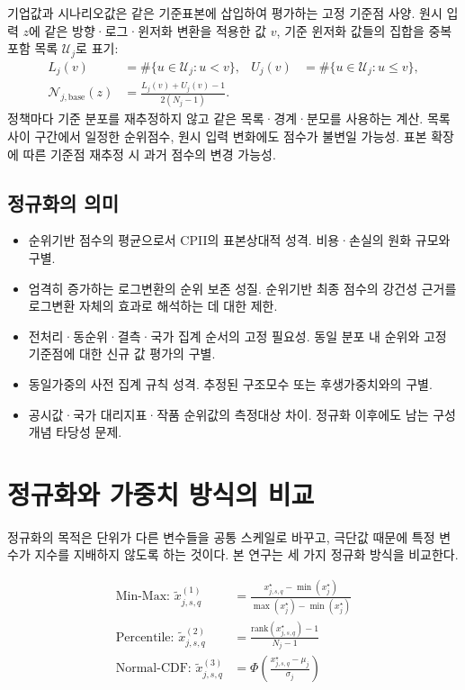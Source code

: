 \documentclass[11pt,a4paper]{report}
\begin{document}
기업값과 시나리오값은 같은 기준표본에 삽입하여 평가하는 고정 기준점 사양. 원시 입력 \(z\)에 같은 방향·로그·윈저화 변환을 적용한 값 \(v\), 기준 윈저화 값들의 집합을 중복 포함 목록 \(\mathcal U_j\)로 표기:
\[
\begin{aligned}
L_j(v)&=\#\{u\in\mathcal U_j:u<v\},&
U_j(v)&=\#\{u\in\mathcal U_j:u\le v\},\\
\mathcal N_{j,\mathrm{base}}(z)
&=\frac{L_j(v)+U_j(v)-1}{2(N_j-1)}.
\end{aligned}
\]
정책마다 기준 분포를 재추정하지 않고 같은 목록·경계·분모를 사용하는 계산. 목록 사이 구간에서 일정한 순위점수, 원시 입력 변화에도 점수가 불변일 가능성. 표본 확장에 따른 기준점 재추정 시 과거 점수의 변경 가능성.

\subsection{정규화의 의미}
\begin{itemize}[leftmargin=1.8em,itemsep=0.35em]
\item 순위기반 점수의 평균으로서 CPII의 표본상대적 성격. 비용·손실의 원화 규모와 구별.
\item 엄격히 증가하는 로그변환의 순위 보존 성질. 순위기반 최종 점수의 강건성 근거를 로그변환 자체의 효과로 해석하는 데 대한 제한.
\item 전처리·동순위·결측·국가 집계 순서의 고정 필요성. 동일 분포 내 순위와 고정 기준점에 대한 신규 값 평가의 구별.
\item 동일가중의 사전 집계 규칙 성격. 추정된 구조모수 또는 후생가중치와의 구별.
\item 공시값·국가 대리지표·작품 순위값의 측정대상 차이. 정규화 이후에도 남는 구성개념 타당성 문제.
\end{itemize}

\section{정규화와 가중치 방식의 비교}
정규화의 목적은 단위가 다른 변수들을 공통 스케일로 바꾸고, 극단값 때문에 특정 변수가 지수를 지배하지 않도록 하는 것이다. 본 연구는 세 가지 정규화 방식을 비교한다.

\begin{align}
\text{Min-Max: } \widetilde{x}^{(1)}_{j,s,q} &= \frac{x^{\star}_{j,s,q} - \min(x^{\star}_{j})}{\max(x^{\star}_{j}) - \min(x^{\star}_{j})} \\
\text{Percentile: } \widetilde{x}^{(2)}_{j,s,q} &= \frac{\mathrm{rank}(x^{\star}_{j,s,q}) - 1}{N_j - 1} \\
\text{Normal-CDF: } \widetilde{x}^{(3)}_{j,s,q} &= \Phi\!\left(\frac{x^{\star}_{j,s,q} - \mu_j}{\sigma_j}\right) \label{eq:cpii_normalization_methods}
\end{align}
\end{document}

